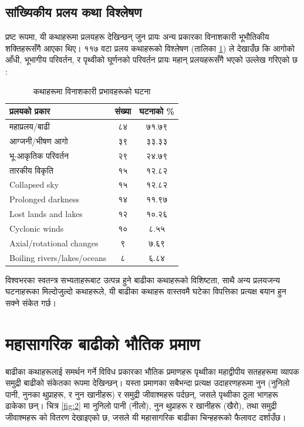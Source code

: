\documentclass[10pt,twocolumn,letterpaper]{article}
\begin{document}
\subsection{सांख्यिकीय प्रलय कथा विश्लेषण}

प्रष्ट रूपमा, यी कथाहरूमा प्रलयहरू देखिन्छन् जुन प्रायः अन्य प्रकारका विनाशकारी भूभौतिकीय शक्तिहरूसँगै आएका थिए। ११७ वटा प्रलय कथाहरूको विश्लेषण (तालिका \ref{tab: 1}) ले देखाउँछ कि आगोको आँधी, भूभागीय परिवर्तन, र पृथ्वीको घूर्णनको परिवर्तन प्रायः महान् प्रलयहरूसँगै भएको उल्लेख गरिएको छ \cite{14}:

\begin{table}[ht]
\begin{center}
\renewcommand{\arraystretch}{1.2}  %
\begin{tabular}{|l|c|c|}
\hline
\textbf{प्रलयको प्रकार} & \textbf{संख्या} & \textbf{घटनाको \%} \\
\hline\hline
महाप्रलय/बाढी            & ८४ & ७१.७९ \\
आग्जनी/भीषण आगो & ३९ & ३३.३३ \\
भू-आकृतिक परिवर्तन   & २९ & २४.७९ \\
तारकीय विकृति     & १५ & १२.८२ \\

Collapsed sky           & १५ & १२.८२ \\
Prolonged darkness      & १४ & ११.९७ \\
Lost lands and lakes    & १२ & १०.२६ \\
Cyclonic winds          & १० & ८.५५  \\
Axial/rotational changes & ९ & ७.६९  \\
Boiling rivers/lakes/oceans & ८ & ६.८४ \\
\hline
\end{tabular}
\end{center}
\caption{कथाहरूमा विनाशकारी प्रभावहरूको घटना}
\label{tab: 1}
\end{table}

विश्वभरका स्वतन्त्र सभ्यताहरूबाट उत्पन्न हुने बाढीका कथाहरूको विशिष्टता, साथै अन्य प्रलयजन्य घटनाहरूका मिल्दोजुल्दो कथाहरूले, यी बाढीका कथाहरू वास्तवमै घटेका विपत्तिका प्रत्यक्ष बयान हुन सक्ने संकेत गर्छ।

\section{महासागरिक बाढीको भौतिक प्रमाण}

बाढीका कथाहरूलाई समर्थन गर्ने विविध प्रकारका भौतिक प्रमाणहरू पृथ्वीका महाद्वीपीय सतहहरूमा व्यापक समुद्री बाढीको संकेतका रूपमा देखिन्छन्। यस्ता प्रमाणका सबैभन्दा प्रत्यक्ष उदाहरणहरूमा नुन (नुनिलो पानी, नुनका थुप्राहरू, र नुन खानीहरू) र समुद्री जीवाश्महरू पर्दछन्, जसले पृथ्वीका ठूला भागहरू ढाकेका छन्। चित्र \ref{fig:2} मा नुनिलो पानी (नीलो), नुन थुप्राहरू र खानीहरू (खैरो), तथा समुद्री जीवाश्महरू \cite{15,16,86,87} को वितरण देखाइएको छ, जसले यी महासागरिक बाढीका चिन्हहरूको फैलावट दर्शाउँछ।
\end{document}
